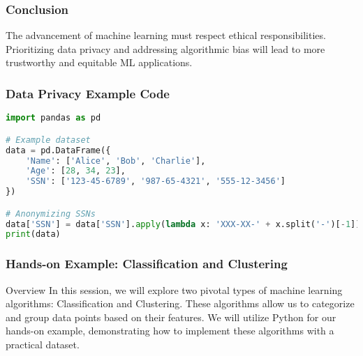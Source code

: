 \documentclass[aspectratio=169]{beamer}
\begin{document}
\begin{frame}[fragile]
    \frametitle{Conclusion}
    The advancement of machine learning must respect ethical responsibilities. 
    Prioritizing data privacy and addressing algorithmic bias will lead to more trustworthy and equitable ML applications.
\end{frame}

\begin{frame}[fragile]
    \frametitle{Data Privacy Example Code}
    \begin{lstlisting}[language=Python]
import pandas as pd

# Example dataset
data = pd.DataFrame({
    'Name': ['Alice', 'Bob', 'Charlie'],
    'Age': [28, 34, 23],
    'SSN': ['123-45-6789', '987-65-4321', '555-12-3456']
})

# Anonymizing SSNs
data['SSN'] = data['SSN'].apply(lambda x: 'XXX-XX-' + x.split('-')[-1])
print(data)
    \end{lstlisting}
\end{frame}

\begin{frame}
    \frametitle{Hands-on Example: Classification and Clustering}
    \begin{block}{Overview}
        In this session, we will explore two pivotal types of machine learning algorithms: Classification and Clustering. 
        These algorithms allow us to categorize and group data points based on their features. We will utilize Python for our hands-on example, demonstrating how to implement these algorithms with a practical dataset.
    \end{block}
\end{frame}
\end{document}
